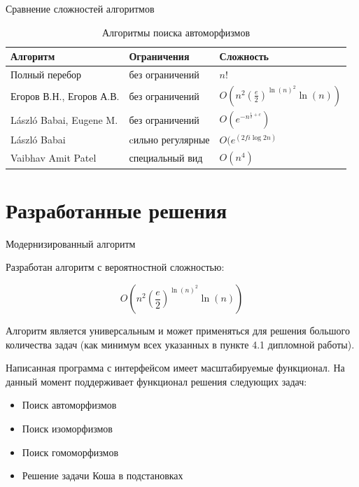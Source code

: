 \documentclass{beamer}
\begin{document}
\begin{frame}{Сравнение сложностей алгоритмов}

\begin{table}[h]
\centering
\small
\begin{tabular}[t]{|l|l|l|}
\hline
\textbf{Алгоритм} & \textbf{Ограничения} & \textbf{Сложность}\\
\hline
Полный перебор & без ограничений & $n!$\\
\hline
Егоров В.Н., Егоров А.В. & без ограничений & $O(n^2(\frac{e}{2})^{\ln(n)^2} \ln(n))$\\
\hline
László Babai, Eugene M. & без ограничений & $O(e^{-n^{\frac{1}{2} + c}})$\\
\hline
László Babai & cильно регулярные & $O(e^(2fi \log2 n)$\\
\hline
Vaibhav Amit Patel & специальный вид & $O(n^4)$\\
\hline
\end{tabular}
\caption{Алгоритмы поиска автоморфизмов}
\end{table}

\end{frame}


\section{Разработанные решения}

\begin{frame}{Модернизированный алгоритм}

Разработан алгоритм с вероятностной сложностью:

$$O(n^2(\frac{e}{2})^{\ln(n)^2} \ln(n))$$

Алгоритм является универсальным и может применяться для решения большого количества задач (как минимум всех указанных в пункте 4.1 дипломной работы).

Написанная программа с интерфейсом имеет масштабируемые функционал. На данный момент поддерживает функционал решения следующих задач:

\begin{itemize}
\item Поиск автоморфизмов
\item Поиск изоморфизмов
\item Поиск гомоморфизмов
\item Решение задачи Коша в подстановках
\end{itemize}

\end{frame}
\end{document}
